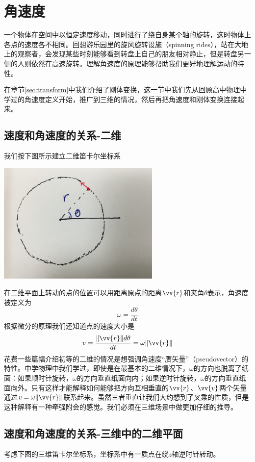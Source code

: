 \documentclass[11pt]{article}
\begin{document}
\section{角速度}\label{sec:angular}
一个物体在空间中以恒定速度移动，同时进行了绕自身某个轴的旋转，这时物体上各点的速度各不相同。回想游乐园里的旋风旋转设施（spinning rides），站在大地上的观察者，会发现某些时刻能够看到转盘上自己的朋友相对静止，但是转盘另一侧的人则依然在高速旋转。理解角速度的原理能够帮助我们更好地理解运动的特性。

在章节\ref{sec:transform}中我们介绍了刚体变换，这一节中我们先从回顾高中物理中学过的角速度定义开始，推广到三维的情况，然后再把角速度和刚体变换连接起来。
\subsection{速度和角速度的关系-二维}	
我们按下图所示建立二维笛卡尔坐标系

\begin{center}
\includegraphics[width=0.6\textwidth]{images/IMG_2298.jpg}
\end{center}

在二维平面上转动的点的位置可以用距离原点的距离$\vv{r}$和夹角$\theta$表示，角速度被定义为
$$
\omega = \frac{d\theta}{dt}
$$
根据微分的原理我们还知道点的速度大小是
$$
v = \frac{\|\vv{r}\|d\theta}{dt} = \omega \|\vv{r}\|
$$
花费一些篇幅介绍初等的二维的情况是想强调角速度“赝矢量”（pseudovector）的特性。中学物理中我们学过，即使是在最基本的二维情况下，$\omega$的方向也脱离了纸面：如果顺时针旋转，$\omega$的方向垂直纸面向内；如果逆时针旋转，$\omega$的方向垂直纸面向外。只有这样才能解释如何能够把方向互相垂直的$\vv{r}$、$\vv{v}$两个矢量通过$v = \omega \|\vv{r}\|$联系起来。虽然三者垂直让我们大约想到了叉乘的性质，但是这种解释有一种牵强附会的感觉。我们必须在三维场景中做更加仔细的推导。

\subsection{速度和角速度的关系-三维中的二维平面}	\label{sec:velandw}
考虑下图的三维笛卡尔坐标系，坐标系中有一质点在绕$z$轴逆时针转动。
\end{document}

